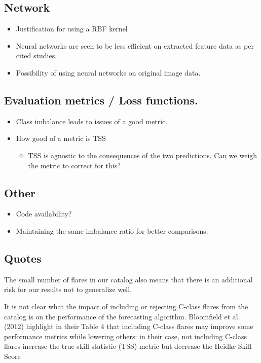 \documentclass{../template/texnote}
\begin{document}
	\subsection{Network}
	\begin{itemize}
		\item Justification for using a RBF kernel
		\item Neural networks are  seen to be less efficient on extracted feature data as per cited studies.
		\item Possibility of using neural networks on original image data. 

	\end{itemize}
	\subsection{Evaluation metrics / Loss functions.}
	\begin{itemize}
		\item Class imbalance leads to issues of a good metric.
	\item How good of a metric is TSS
	\begin{itemize}
		\item TSS is agnostic to the consequences of the two predictions. Can we weigh the metric to correct for this? 
	\end{itemize}
	\end{itemize}

	\subsection{Other}
	\begin{itemize}
		\item Code availability?
		\item Maintaining the same imbalance ratio for better comparisons.

	\end{itemize}


	\subsection{Quotes}

The small number of flares in our catalog also means that there is an additional risk for our results not to generalize well.

It is not clear what the impact of including or rejecting C-class flares from the catalog is on the performance of the forecasting algorithm. Bloomfield et al. (2012) highlight in their Table 4 that including C-class flares may improve some performance metrics while lowering others: in their case, not including C-class flares increase the true skill statistic (TSS) metric but decrease the Heidke Skill Score
    \printbibliography
\end{document}
